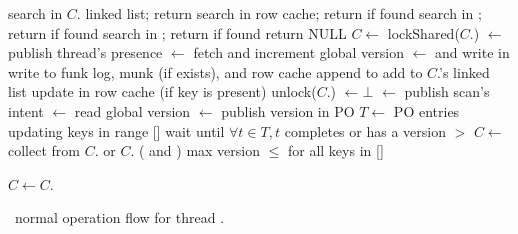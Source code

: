 \begin{algorithm}[tb]
\begin{algorithmic}[1]{}
			\State search  in $C$. linked list;  return 
		\EndIf
		\State search  in row cache; return  if found
			\State	search  in ; return  if found
		\EndIf
		\State	search  in ; return  if found
		\State return NULL	
\EndProcedure
\Statex
{}	
		\State $C \leftarrow$ 
		\State lockShared($C$.)
		\State  {}  $\leftarrow$ 
			 \Comment publish  thread's presence 
		\State {} $\leftarrow$    \Comment fetch and increment global version
		\State  {}  $\leftarrow$ 
			\Comment and write in 
		\Statex \Comment write  to funk log, munk (if exists), and row cache  
		\State append  to 
			\State add   to $C$.'s linked list
		\EndIf
		\State update  in row cache (if key is present)
		\State unlock($C$.)
		\State {}  $\leftarrow \bot$ 
\EndProcedure
\Statex
{}
		\State  {}  $\leftarrow$  \Comment publish scan's intent 
		\State {} $\leftarrow$    \Comment read global version
		\State  {}  $\leftarrow$ 
		\Comment publish version in PO
		\State  $T \leftarrow $  PO entries updating keys in range [] 
		\State wait until $\forall t \in T, t$  completes or has a version $>$   
		\State $C \leftarrow$ 
		\Repeat
				\State collect from $C$. or $C$. ( and )
				\Statex \hspace{1cm} max version $\le$ for all keys in [] 

			\State $C \leftarrow C$. 
\EndProcedure	
\end{algorithmic}
\caption{\sys\ normal operation flow for thread .}
\label{alg:ops}
\end{algorithm}


